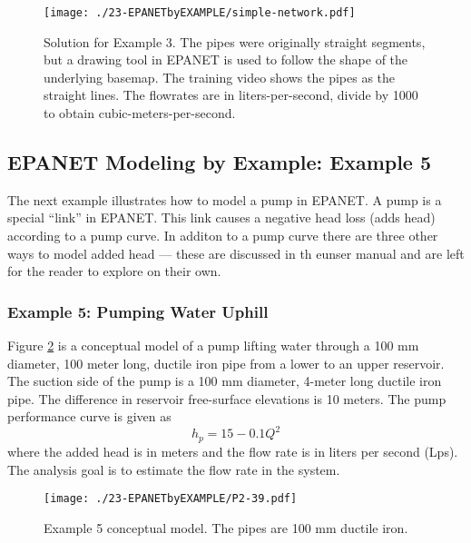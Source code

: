 \begin{figure}[htbp] %
   \centering
   \texttt{[image: ./23-EPANETbyEXAMPLE/simple-network.pdf]} 
   \caption{Solution for Example 3.  The pipes were originally straight segments, but a drawing tool in EPANET is used to follow the shape of the underlying basemap.   The training video shows the pipes as the straight lines.  The flowrates are in liters-per-second, divide by 1000 to obtain cubic-meters-per-second.}
   \label{fig:simple-network}
\end{figure}



\subsection{EPANET Modeling by Example:  Example 5}
The next example illustrates how to model a pump in EPANET.  A pump is a special ``link'' in EPANET.  This link causes a negative head loss (adds head) according to a pump curve.  In additon to a pump curve there are three other ways to model added head --- these are discussed in th eunser manual and are left for the reader to explore on their own.
\subsubsection{Example 5: Pumping Water Uphill}
Figure \ref{fig:P2-39.pdf} is a conceptual model of a pump lifting water through a 100 mm diameter, 100 meter long, ductile iron pipe from a lower to an upper reservoir.  The suction side of the pump is a 100 mm diameter, 4-meter long ductile iron pipe.  The difference in reservoir free-surface elevations is 10 meters.  The pump performance curve is given as
\begin{equation}
h_p = 15 - 0.1 Q^2
\end{equation}
where the added head is in meters and the flow rate is in liters per second (Lps).  The analysis goal is to estimate the flow rate in the system.
\begin{figure}[htbp] %
   \centering
   \texttt{[image: ./23-EPANETbyEXAMPLE/P2-39.pdf]} 
   \caption{Example 5 conceptual model.  The pipes are 100 mm ductile iron.}
   \label{fig:P2-39.pdf}
\end{figure}

